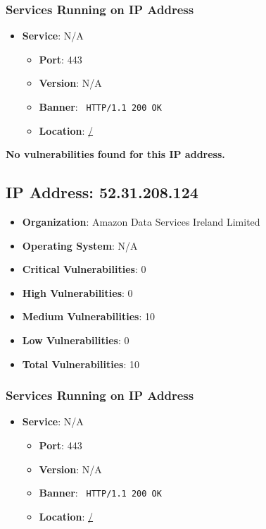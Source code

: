 \documentclass{article}
\begin{document}
\subsubsection*{Services Running on IP Address}

\begin{itemize}
    
        \item \textbf{Service}: N/A
        \begin{itemize}
            \item \textbf{Port}: 443
            \item \textbf{Version}:  N/A 
            \item \textbf{Banner}: \texttt{
                HTTP/1.1 200 OK
            }
            \item \textbf{Location}: \href{ / }{ / }
        \end{itemize}
    
\end{itemize}


\textbf{No vulnerabilities found for this IP address.}




\clearpage



\subsection*{IP Address: 52.31.208.124}

\begin{itemize}
    \item \textbf{Organization}: Amazon Data Services Ireland Limited
    \item \textbf{Operating System}:  N/A 
    \item \textbf{Critical Vulnerabilities}: 0
    \item \textbf{High Vulnerabilities}: 0
    \item \textbf{Medium Vulnerabilities}: 10
    \item \textbf{Low Vulnerabilities}: 0
    \item \textbf{Total Vulnerabilities}: 10
\end{itemize}

\subsubsection*{Services Running on IP Address}

\begin{itemize}
    
        \item \textbf{Service}: N/A
        \begin{itemize}
            \item \textbf{Port}: 443
            \item \textbf{Version}:  N/A 
            \item \textbf{Banner}: \texttt{
                HTTP/1.1 200 OK
            }
            \item \textbf{Location}: \href{ / }{ / }
        \end{itemize}
    
\end{itemize}
\end{document}
